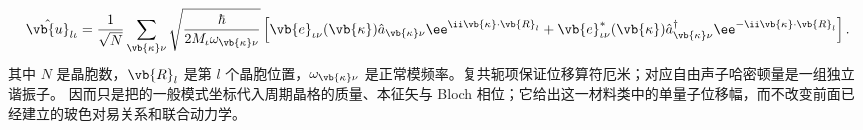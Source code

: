 \begin{equation}
{
\hat{\vb{u}}_{l\iota}
=\frac1{\sqrt N}\sum_{\vb{\kappa}\nu}
\sqrt{\frac{\hbar}{2M_\iota\omega_{\vb{\kappa}\nu}}}
\left[
\vb{e}_{\iota\nu}(\vb{\kappa})\hat a_{\vb{\kappa}\nu}\ee^{\ii\vb{\kappa}\cdot\vb{R}_l}
+\vb{e}_{\iota\nu}^{*}(\vb{\kappa})\hat a_{\vb{\kappa}\nu}^{\dagger}\ee^{-\ii\vb{\kappa}\cdot\vb{R}_l}
\right].}
\label{eq:phonon_displacement_quantization}
\end{equation}
其中 $N$ 是晶胞数，$\vb{R}_l$ 是第 $l$ 个晶胞位置，$\omega_{\vb{\kappa}\nu}$ 是正常模频率。复共轭项保证位移算符厄米；对应自由声子哈密顿量是一组独立谐振子。 因而只是把的一般模式坐标代入周期晶格的质量、本征矢与 Bloch 相位；它给出这一材料类中的单量子位移幅，而不改变前面已经建立的玻色对易关系和联合动力学。

